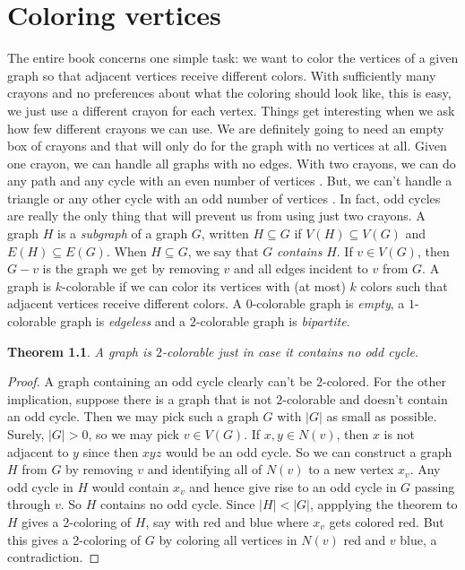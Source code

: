 \documentclass{tufte-book} %
\theoremstyle{plain}
\newtheorem{theorem}{Theorem}
\newcommand{\card}[1]{\left|#1\right|}
\begin{document}
\chapter{Coloring vertices}
The entire book concerns one simple task: we want to color the vertices of a given graph so that adjacent vertices receive different colors.
With sufficiently many crayons and no preferences about what the coloring should look like, this is easy, we just use a different crayon for each vertex.  
Things get interesting when we ask how few different crayons we can use.  We are definitely going to need an empty box of crayons and that will only do for the
graph with no vertices at all.  Given one crayon, we can handle all graphs with no edges.  With two crayons, we can do
any path and any cycle with an even number of vertices \marginnote{\textcolor{blue}{picture}}.  But, we can't handle a triangle or any other cycle with an odd number of vertices \marginnote{\textcolor{blue}{picture}}.
In fact, odd cycles are really the only thing that will prevent us from using just two crayons. 
A graph $H$ is a \emph{subgraph} of a graph $G$, written $H \subseteq G$ if $V(H) \subseteq V(G)$ and $E(H) \subseteq E(G)$. 
When $H \subseteq G$, we say that $G$ \emph{contains} $H$.   If $v \in V(G)$, then $G-v$ is the graph we get by removing $v$ and all edges incident to $v$ from $G$. 
A graph is $k$-colorable if we can color its vertices with (at most) $k$ colors such that adjacent vertices receive different colors. 
A $0$-colorable graph is \emph{empty}, a $1$-colorable graph is \emph{edgeless} and a $2$-colorable graph is \emph{bipartite}. 
\begin{theorem}\label{TwoColoring}
A graph is $2$-colorable just in case it contains no odd cycle.
\end{theorem}
\begin{proof}
A graph containing an odd cycle clearly can't be $2$-colored.  For the other implication, suppose
there is a graph that is not $2$-colorable and doesn't contain an odd cycle.  Then we may pick such a graph $G$ with $\card{G}$ as small as possible.
Surely, $|G| > 0$, so we may pick $v \in V(G)$.  If $x, y \in N(v)$, then $x$ is not adjacent to $y$ since then $xyz$ would be an odd cycle.
So we can construct a graph $H$ from $G$ by removing $v$ and identifying all of $N(v)$ to a new vertex $x_v$.  Any odd cycle
in $H$ would contain $x_v$ and hence give rise to an odd cycle in $G$ passing through $v$.  So $H$ contains no odd cycle. Since $|H| < |G|$, appplying the theorem to $H$ gives a 2-coloring of $H$, say with red and blue
where $x_v$ gets colored red.  But this gives a 2-coloring of $G$ by coloring all vertices in $N(v)$ red and $v$ blue, a contradiction.
\end{proof}
\end{document}
